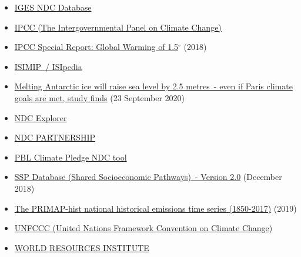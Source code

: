 \documentclass[12pt]{article}
\begin{document}
\begin{itemize}
 \vspace{-.2cm} \item \href{https://www.iges.or.jp/en/pub/iges-indc-ndc-database/en}{IGES NDC Database} 
 \vspace{-.2cm} \item \href{https://www.ipcc.ch/}{IPCC (The Intergovernmental Panel on Climate Change)} 
 \vspace{-.2cm} \item \href{https://www.ipcc.ch/sr15/}{IPCC Special Report: Global Warming of 1.5$^{\circ}$} (2018)
 \vspace{-.2cm} \item \href{https://www.isimip.org/isipedia/#isipedia-portal}{ISIMIP~/ ISIpedia} 
 \vspace{-.2cm} \item \href{https://www.theguardian.com/environment/2020/sep/23/melting-antarctic-ice-will-raise-sea-level-by-25-metres-even-if-paris-climate-goals-are-met-study-finds?CMP=share_btn_tw&utm_campaign=Carbon%20Brief%20Daily%20Briefing&utm_medium=email&utm_source=Revue%20newsletter}{Melting Antarctic ice will raise sea level by 2.5 metres~- even if Paris climate goals are met, study finds} (23 September 2020)
 \vspace{-.2cm} \item \href{https://klimalog.die-gdi.de/ndc/#NDCExplorer/worldMap?NDC??income???catIncome}{NDC Explorer} 
 \vspace{-.2cm} \item \href{https://ndcpartnership.org/}{NDC PARTNERSHIP} 
 \vspace{-.2cm} \item \href{https://themasites.pbl.nl/o/climate-ndc-policies-tool/}{PBL Climate Pledge NDC tool} 
 \vspace{-.2cm} \item \href{https://tntcat.iiasa.ac.at/SspDb/dsd?Action=htmlpage&page=about}{SSP Database (Shared Socioeconomic Pathways)~- Version 2.0} (December 2018)
 \vspace{-.2cm} \item \href{https://dataservices.gfz-potsdam.de/pik/showshort.php?id=escidoc:4736895}{The PRIMAP-hist national historical emissions time series (1850-2017)} (2019)
 \vspace{-.2cm} \item \href{https://unfccc.int/}{UNFCCC (United Nations Framework Convention on Climate Change)} 
 \vspace{-.2cm} \item \href{https://www.wri.org/}{WORLD RESOURCES INSTITUTE} 

\end{itemize}
\end{document}
